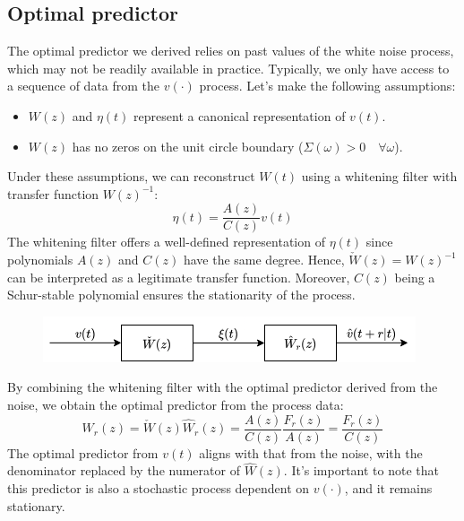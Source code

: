\subsection{Optimal predictor}
The optimal predictor we derived relies on past values of the white noise process, which may not be readily available in practice. 
Typically, we only have access to a sequence of data from the $v(\cdot)$ process. 
Let's make the following assumptions:
\begin{itemize}
    \item $W(z)$ and $\eta(t)$ represent a canonical representation of $v(t)$.
    \item $W(z)$ has no zeros on the unit circle boundary ($\Sigma(\omega)>0 \quad \forall\omega$).
\end{itemize}
Under these assumptions, we can reconstruct $W(t)$ using a whitening filter with transfer function $W(z)^{-1}$:
\[\eta(t)=\dfrac{A(z)}{C(z)}v(t)\]
The whitening filter offers a well-defined representation of $\eta(t)$ since polynomials $A(z)$ and $C(z)$ have the same degree. 
Hence, $\check{W}(z) = W(z)^{-1}$ can be interpreted as a legitimate transfer function. Moreover, $C(z)$ being a Schur-stable polynomial ensures the stationarity of the process.
\begin{figure}[H]
    \centering
    \includegraphics[width=0.75\linewidth]{images/wn.png}
\end{figure}
By combining the whitening filter with the optimal predictor derived from the noise, we obtain the optimal predictor from the process data:
\[W_r(z)=\check{W}(z)\hat{W}_r(z)=\dfrac{A(z)}{C(z)}\dfrac{F_r(z)}{A(z)}=\dfrac{F_r(z)}{C(z)}\]
The optimal predictor from $v(t)$ aligns with that from the noise, with the denominator replaced by the numerator of $\hat{W}(z)$. 
It's important to note that this predictor is also a stochastic process dependent on $v(\cdot)$, and it remains stationary.

